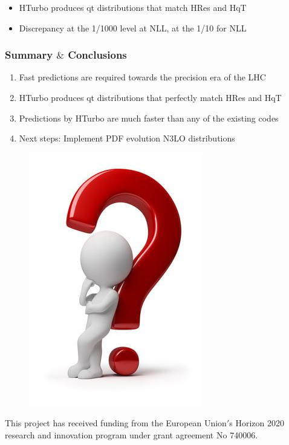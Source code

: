 \documentclass[aspectratio=43]{beamer}
\begin{document}
\begin{frame}
\begin{itemize}
	\item HTurbo produces qt distributions that match HRes and HqT
	\item Discrepancy at the 1/1000 level at NLL, at the 1/10 for NLL
\end{itemize}

\end{frame}

\begin{frame}
	
	\frametitle{Summary $\&$ Conclusions}

	\vspace{2.0 cm}
	
	\begin{enumerate}
		\item Fast predictions are required towards the precision era of the LHC
		\item HTurbo produces qt distributions that perfectly match HRes and HqT
		\item Predictions by HTurbo are much faster than any of the existing codes
		\item Next steps: Implement PDF evolution N3LO distributions

	\end{enumerate}

	\vspace{2.0 cm}

\end{frame}

\begin{frame}


	\begin{figure}
		\includegraphics[width = 4 cm]{plots/thinking.png}
	\end{figure}		


{\small \color{blue} This project has received funding from the European Union$'$s Horizon 2020 research and innovation program under grant agreement No 740006.}

\end{frame}
\end{document}
